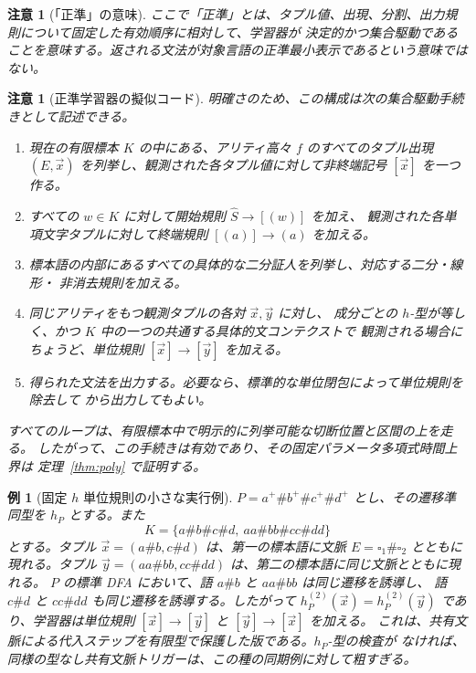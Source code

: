 \documentclass[11pt,a4paper]{ltjsarticle}
\newtheorem{remark}[theorem]{注意}
\newtheorem{example}[theorem]{例}
\theoremstyle{remark}
\newcommand{\tuple}[1]{\vec{#1}}
\newcommand{\blank}{\square}
\begin{document}
\begin{remark}[「正準」の意味]
\label{rem:canonical-meaning}
ここで「正準」とは、タプル値、出現、分割、出力規則について固定した有効順序に相対して、学習器が
決定的かつ集合駆動であることを意味する。返される文法が対象言語の正準最小表示であるという意味では
ない。
\end{remark}

\begin{remark}[正準学習器の擬似コード]
\label{rem:learner-pseudocode}
明確さのため、この構成は次の集合駆動手続きとして記述できる。
\begin{enumerate}[label=\textnormal{手順 \arabic*.},leftmargin=*]
\item 現在の有限標本 \(K\) の中にある、アリティ高々 \(f\) のすべてのタプル出現
\((E,\tuple x)\) を列挙し、観測された各タプル値に対して非終端記号
\([\tuple x]\) を一つ作る。
\item すべての \(w\in K\) に対して開始規則 \(\widehat S\to[(w)]\) を加え、
観測された各単項文字タプルに対して終端規則 \([(a)]\to(a)\) を加える。
\item 標本語の内部にあるすべての具体的な二分証人を列挙し、対応する二分・線形・
非消去規則を加える。
\item 同じアリティをもつ観測タプルの各対 \(\tuple x,\tuple y\) に対し、
成分ごとの \(h\)-型が等しく、かつ \(K\) 中の一つの共通する具体的文コンテクストで
観測される場合にちょうど、単位規則 \([\tuple x]\to[\tuple y]\) を加える。
\item 得られた文法を出力する。必要なら、標準的な単位閉包によって単位規則を除去して
から出力してもよい。
\end{enumerate}
すべてのループは、有限標本中で明示的に列挙可能な切断位置と区間の上を走る。
したがって、この手続きは有効であり、その固定パラメータ多項式時間上界は
定理~\ref{thm:poly} で証明する。
\end{remark}

\begin{example}[固定 \(h\) 単位規則の小さな実行例]
\label{ex:learner-trace}
\(P=a^+\#b^+\#c^+\#d^+\) とし、その遷移準同型を \(h_P\) とする。また
\[
  K=\{a\#b\#c\#d,\ aa\#bb\#cc\#dd\}
\]
とする。タプル \(\tuple x=(a\#b,c\#d)\) は、第一の標本語に文脈
\(E=\blank_1\#\blank_2\) とともに現れる。タプル
\(\tuple y=(aa\#bb,cc\#dd)\) は、第二の標本語に同じ文脈とともに現れる。
\(P\) の標準 DFA において、語 \(a\#b\) と \(aa\#bb\) は同じ遷移を誘導し、
語 \(c\#d\) と \(cc\#dd\) も同じ遷移を誘導する。したがって
\(h_P^{(2)}(\tuple x)=h_P^{(2)}(\tuple y)\) であり、学習器は単位規則
\([\tuple x]\to[\tuple y]\) と \([\tuple y]\to[\tuple x]\) を加える。
これは、共有文脈による代入ステップを有限型で保護した版である。\(h_P\)-型の検査が
なければ、同様の型なし共有文脈トリガーは、この種の同期例に対して粗すぎる。
\end{example}
\end{document}
